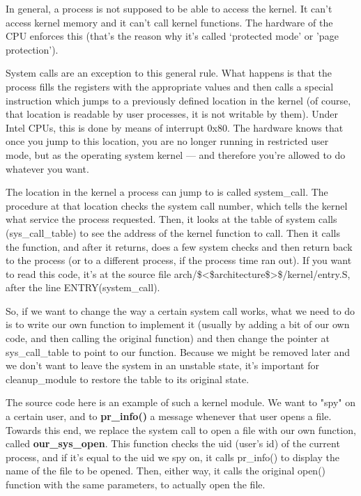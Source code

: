 \documentclass[11pt]{article}
\begin{document}
In general, a process is not supposed to be able to access the kernel. It can't access kernel memory and it can't call kernel functions. The hardware of the CPU enforces this (that's the reason why it's called `protected mode' or 'page protection').

System calls are an exception to this general rule. What happens is that the process fills the registers with the appropriate values and then calls a special instruction which jumps to a previously defined location in the kernel (of course, that location is readable by user processes, it is not writable by them). Under Intel CPUs, this is done by means of interrupt 0x80. The hardware knows that once you jump to this location, you are no longer running in restricted user mode, but as the operating system kernel --- and therefore you're allowed to do whatever you want.

The location in the kernel a process can jump to is called system\_call. The procedure at that location checks the system call number, which tells the kernel what service the process requested. Then, it looks at the table of system calls (sys\_call\_table) to see the address of the kernel function to call. Then it calls the function, and after it returns, does a few system checks and then return back to the process (or to a different process, if the process time ran out). If you want to read this code, it's at the source file arch/\$<\$architecture\$>\$/kernel/entry.S, after the line ENTRY(system\_call).

So, if we want to change the way a certain system call works, what we need to do is to write our own function to implement it (usually by adding a bit of our own code, and then calling the original function) and then change the pointer at sys\_call\_table to point to our function. Because we might be removed later and we don't want to leave the system in an unstable state, it's important for cleanup\_module to restore the table to its original state.

The source code here is an example of such a kernel module. We want to "spy" on a certain user, and to \textbf{pr\_info()} a message whenever that user opens a file. Towards this end, we replace the system call to open a file with our own function, called \textbf{our\_sys\_open}. This function checks the uid (user's id) of the current process, and if it's equal to the uid we spy on, it calls pr\_info() to display the name of the file to be opened. Then, either way, it calls the original open() function with the same parameters, to actually open the file.
\end{document}
